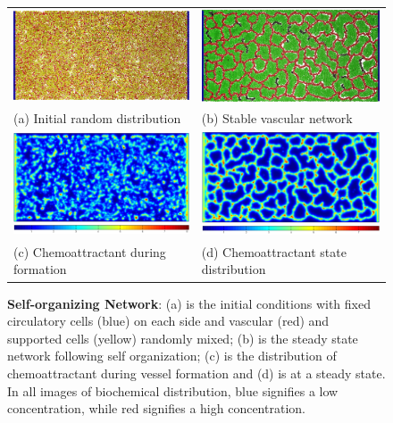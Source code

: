 \begin{figure}[t]
    \begin{center}
        \begin{tabular}{m{6cm}m{6cm}}
            \includegraphics[width=5.9cm]{./figures/init_state.png} &
            \includegraphics[width=5.9cm]{./figures/vessel30.png}\\
            (a) Initial random distribution      & (b) Stable vascular network
            \\
            \includegraphics[width=5.9cm]{./figures/Chemo_init_state.png}
            \hspace{50mm} &
            \includegraphics[width=5.9cm]{./figures/Chemo_steady_state.png}
            \hspace{50mm}\\
            (c) Chemoattractant during formation & (d) Chemoattractant state
            distribution \\
        \end{tabular}
    \end{center}
    \caption{\textbf{Self-organizing Network}: (a) is the initial conditions with
    fixed circulatory cells (blue) on each side and vascular (red) and supported
    cells (yellow) randomly mixed; (b) is the steady state network following self
    organization; (c) is the distribution of chemoattractant during vessel formation
    and (d) is at a steady state. In all images of biochemical distribution, blue
    signifies a low concentration, while red signifies a high concentration.}
    \vspace{+1mm}
    \label{phaseOne}
\end{figure} 
